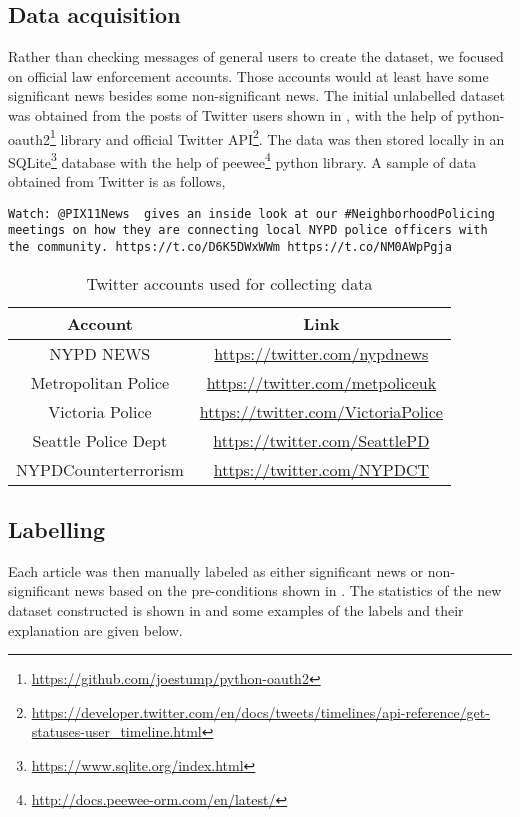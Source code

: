 \subsection{Data acquisition}
Rather than checking messages of general users to create the dataset, we focused on official law enforcement accounts. Those accounts would at least have some significant news besides some non-significant news.
The initial unlabelled dataset was obtained from the posts of Twitter users shown in , with the help of python-oauth2\footnote{\url{https://github.com/joestump/python-oauth2}} library and official Twitter API\footnote{\url{https://developer.twitter.com/en/docs/tweets/timelines/api-reference/get-statuses-user_timeline.html}}. The data was then stored locally in an SQLite\footnote{\url{https://www.sqlite.org/index.html}} database with the help of peewee\footnote{\url{http://docs.peewee-orm.com/en/latest/}} python library. A sample of data obtained from Twitter is as follows,

\begin{verbatim}
Watch: @PIX11News  gives an inside look at our #NeighborhoodPolicing
meetings on how they are connecting local NYPD police officers with
the community. https://t.co/D6K5DWxWWm https://t.co/NM0AWpPgja
\end{verbatim}

\begin{table}
    \centering
    \caption{Twitter accounts used for collecting data}
    \label{tbl:twitter_users}
    \begin{tabular}{c|c}
    \toprule
    Account & Link \\
    \midrule
    NYPD NEWS & \url{https://twitter.com/nypdnews} \\
    Metropolitan Police & \url{https://twitter.com/metpoliceuk} \\
    Victoria Police & \url{https://twitter.com/VictoriaPolice} \\
    Seattle Police Dept & \url{https://twitter.com/SeattlePD} \\
    NYPDCounterterrorism & \url{https://twitter.com/NYPDCT} \\
    \bottomrule
    \end{tabular}
\end{table}


\subsection{Labelling}
Each article was then manually labeled as either significant news or non-significant news based on the pre-conditions shown in . The statistics of the new dataset constructed is shown in   and some examples of the labels and their explanation are given below.

